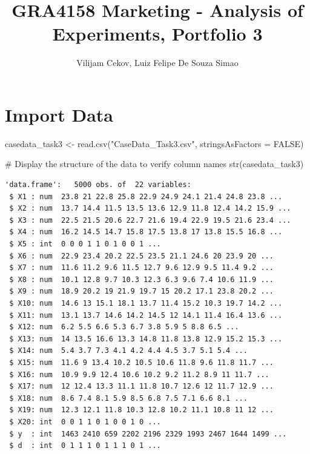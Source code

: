 \documentclass[
  letterpaper,
  DIV=11,
  numbers=noendperiod]{scrartcl}
\title{GRA4158 Marketing - Analysis of Experiments, Portfolio 3}
\author{Vilijam Cekov, Luiz Felipe De Souza Simao}
\date{}
\newenvironment{Shaded}{\begin{snugshade}}{\end{snugshade}}
\newcommand{\AttributeTok}[1]{\textcolor[rgb]{0.40,0.45,0.13}{#1}}
\newcommand{\CommentTok}[1]{\textcolor[rgb]{0.37,0.37,0.37}{#1}}
\newcommand{\ConstantTok}[1]{\textcolor[rgb]{0.56,0.35,0.01}{#1}}
\newcommand{\FunctionTok}[1]{\textcolor[rgb]{0.28,0.35,0.67}{#1}}
\newcommand{\NormalTok}[1]{\textcolor[rgb]{0.00,0.23,0.31}{#1}}
\newcommand{\OtherTok}[1]{\textcolor[rgb]{0.00,0.23,0.31}{#1}}
\newcommand{\StringTok}[1]{\textcolor[rgb]{0.13,0.47,0.30}{#1}}
\renewcommand*\contentsname{Table of contents}
\newcommand\contentsname{Table of contents}
\begin{document}
\maketitle

\renewcommand*\contentsname{Table of contents}
{
\hypersetup{linkcolor=}
\setcounter{tocdepth}{3}
\tableofcontents
}

\section{Import Data}\label{import-data}

\begin{Shaded}
\begin{Highlighting}[]
\NormalTok{casedata\_task3 }\OtherTok{\textless{}{-}} \FunctionTok{read.csv}\NormalTok{(}\StringTok{"CaseData\_Task3.csv"}\NormalTok{, }\AttributeTok{stringsAsFactors =} \ConstantTok{FALSE}\NormalTok{)}

\CommentTok{\# Display the structure of the data to verify column names}
\FunctionTok{str}\NormalTok{(casedata\_task3)}
\end{Highlighting}
\end{Shaded}

\begin{verbatim}
'data.frame':   5000 obs. of  22 variables:
 $ X1 : num  23.8 21 22.8 25.8 22.9 24.9 24.1 21.4 24.8 23.8 ...
 $ X2 : num  13.7 14.4 11.5 13.5 13.6 12.9 11.8 12.4 14.2 15.9 ...
 $ X3 : num  22.5 21.5 20.6 22.7 21.6 19.4 22.9 19.5 21.6 23.4 ...
 $ X4 : num  16.2 14.5 14.7 15.8 17.5 13.8 17 13.8 15.5 16.8 ...
 $ X5 : int  0 0 0 1 1 0 1 0 0 1 ...
 $ X6 : num  22.9 23.4 20.2 22.5 23.5 21.1 24.6 20 23.9 20 ...
 $ X7 : num  11.6 11.2 9.6 11.5 12.7 9.6 12.9 9.5 11.4 9.2 ...
 $ X8 : num  10.1 12.8 9.7 10.3 12.3 6.3 9.6 7.4 10.6 11.9 ...
 $ X9 : num  18.9 20.2 19 21.9 19.7 15 20.2 17.1 23.8 20.2 ...
 $ X10: num  14.6 13 15.1 18.1 13.7 11.4 15.2 10.3 19.7 14.2 ...
 $ X11: num  13.1 13.7 14.6 14.2 14.5 12 14.1 11.4 16.4 13.6 ...
 $ X12: num  6.2 5.5 6.6 5.3 6.7 3.8 5.9 5 8.8 6.5 ...
 $ X13: num  14 13.5 16.6 13.3 14.8 11.8 13.8 12.9 15.2 15.3 ...
 $ X14: num  5.4 3.7 7.3 4.1 4.2 4.4 4.5 3.7 5.1 5.4 ...
 $ X15: num  11.6 9 13.4 10.2 10.5 10.6 11.8 9.6 11.8 11.7 ...
 $ X16: num  10.9 9.9 12.4 10.6 10.2 9.2 11.2 8.9 11 11.7 ...
 $ X17: num  12 12.4 13.3 11.1 11.8 10.7 12.6 12 11.7 12.9 ...
 $ X18: num  8.6 7.4 8.1 5.9 8.5 6.8 7.5 7.1 6.6 8.1 ...
 $ X19: num  12.3 12.1 11.8 10.3 12.8 10.2 11.1 10.8 11 12 ...
 $ X20: int  0 0 1 1 0 1 0 0 1 0 ...
 $ y  : int  1463 2410 659 2202 2196 2329 1993 2467 1644 1499 ...
 $ d  : int  0 1 1 1 0 1 1 1 0 1 ...
\end{verbatim}
\end{document}
